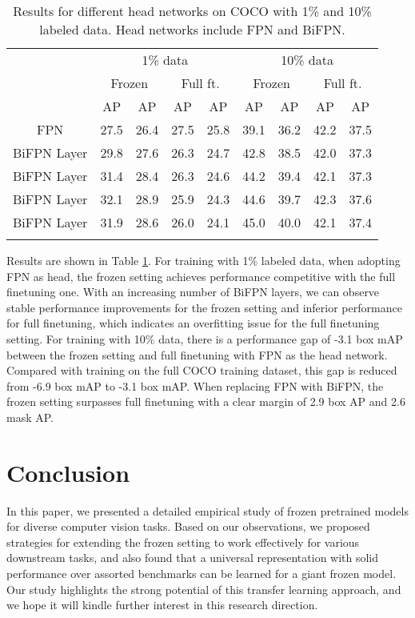 \documentclass{article}
\begin{document}
\begin{table}[h]
        \centering
        \begin{tabular}{c|cccc|cccc}
            \Xhline{1.0pt}
            \multirow{3}{*}{Head Network} &  \multicolumn{4}{c|}{1\% data} & \multicolumn{4}{c}{10\% data} \\
            & \multicolumn{2}{c}{Frozen} & \multicolumn{2}{c|}{Full ft.} & \multicolumn{2}{c}{Frozen} & \multicolumn{2}{c}{Full ft.} \\
            & AP & AP & AP & AP & AP & AP & AP & AP \\
            \hline
            FPN & 27.5 & 26.4 & 27.5 & 25.8 & 39.1 & 36.2 & 42.2 & 37.5 \\
             BiFPN Layer & 29.8 & 27.6 & 26.3 & 24.7 & 42.8 & 38.5 & 42.0 & 37.3 \\
             BiFPN Layer & 31.4 & 28.4 & 26.3 & 24.6 & 44.2 & 39.4  & 42.1 & 37.3 \\
             BiFPN Layer & 32.1 & 28.9 & 25.9 & 24.3 & 44.6 & 39.7 & 42.3 & 37.6 \\
             BiFPN Layer & 31.9 & 28.6 & 26.0 & 24.1 & 45.0 & 40.0 & 42.1 & 37.4 \\
          \Xhline{1.0pt}  
       \end{tabular}
       \caption{Results for different head networks on COCO with 1\% and 10\% labeled data. Head networks include FPN and BiFPN.}
    \label{tab:semi_coco}
\end{table}

Results are shown in Table \ref{tab:semi_coco}. For training with 1\% labeled data, when adopting FPN as head, the frozen setting achieves performance competitive with the full finetuning one. With an increasing number of BiFPN layers, we can observe stable performance improvements for the frozen setting and inferior performance for full finetuning, which indicates an overfitting issue for the full finetuning setting.
For training with 10\% data, there is a performance gap of -3.1 box mAP between the frozen setting and full finetuning with FPN as the head network. Compared with training on the full COCO training dataset, this gap is reduced from -6.9 box mAP to -3.1 box mAP. When replacing FPN with BiFPN, the frozen setting surpasses full finetuning with a clear margin of 2.9 box AP and 2.6 mask AP.

\section{Conclusion}
In this paper, we presented a detailed empirical study of frozen pretrained models for diverse computer vision tasks. Based on our observations, we proposed strategies for extending the frozen setting to work effectively for various downstream tasks, and also found that a universal representation with solid performance over assorted benchmarks can be learned for a giant frozen model. Our study highlights the strong potential of this transfer learning approach, and we hope it will kindle further interest in this research direction.
\end{document}
